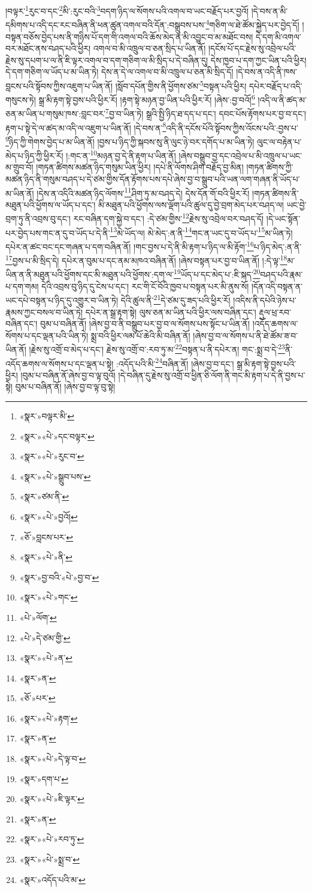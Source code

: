 །བལྟར་\footnote{«སྣར་»བལྟར་མི་}རུང་བ་དང་\footnote{«སྣར་»«པེ་»དང་བལྟར་}མི་:རུང་བའི་\footnote{«སྣར་»«པེ་»རུང་བ་}བདག་ཉིད་ལ་སོགས་པའི་འགལ་བ་ཡང་བརྗོད་པར་བྱའོ། །དེ་བས་ན་མི་དམིགས་པ་འདི་དང་རང་བཞིན་ནི་ཕན་ཚུན་འགལ་བའི་དོན་:བསྒྲུབས་པས་\footnote{«སྣར་»«པེ་»སྒྲུབ་པས་}གཅིག་ལ་ཐེ་ཚོམ་སྐྱེད་པར་བྱེད་དོ། །བསྟན་བཅོས་བྱེད་པས་ནི་གཉིས་པོ་དག་གི་འགལ་བའི་ཆོས་མེད་ན་མི་འབྱུང་བ་མ་མཐོང་བས། དེ་དག་མི་འགལ་བར་མཐོང་ནས་བཤད་པའི་ཕྱིར། འགལ་བ་མི་འཁྲུལ་བ་ཅན་སྲིད་པ་ཡིན་ནོ། །དངོས་པོ་དང་རྗེས་སུ་འབྲེལ་པའི་རྗེས་སུ་དཔག་པ་ལ་ནི་ཇི་ལྟར་འགལ་བ་དག་གཅིག་ལ་མི་སྲིད་པ་དེ་བཞིན་དུ། དེས་ཁྱབ་པ་དག་ཀྱང་ཡིན་པའི་ཕྱིར། དེ་དག་གཅིག་ལ་ཡོད་པ་མ་ཡིན་ཏེ། དེས་ན་དེ་ལ་འགལ་བ་མི་འཁྲུལ་པ་ཅན་མི་སྲིད་དོ། །དེ་བས་ན་འདི་ནི་ཁས་བླངས་པའི་སྟོབས་ཀྱིས་འཇུག་པ་ཡིན་ནོ། །སློབ་དཔོན་གྱིས་ནི་ཕྱོགས་ཙམ་\footnote{«སྣར་»ཙམ་ནི་}བསྟན་པའི་ཕྱིར། དཔེར་བརྗོད་པ་འདི་གསུངས་ཏེ། སྒྲ་མི་རྟག་སྟེ་བྱས་པའི་ཕྱིར་རོ། །རྟག་སྟེ་མཉན་བྱ་ཡིན་པའི་ཕྱིར་རོ། །ཞེས་:བྱ་བའོ།\footnote{«སྣར་»«པེ་»བྱའོ།} །འདི་ལ་ནི་ཚད་མ་ཅན་མ་ཡིན་པ་གསུམ་ཁས་:བླང་བར་\footnote{«ཅོ་»བླངས་པར་}བྱ་བ་ཡིན་ཏེ། སྒྲའི་སྤྱི་ཉིད་ཐ་དད་པ་དང་། དབང་པོས་རྟོགས་པར་བྱ་བ་དང་། རྟག་པ་སྟེ་དེ་ལ་ཚད་མ་འདི་ལ་འཇུག་པ་ཡིན་ནོ། །དེ་བས་ན་\footnote{«སྣར་»«པེ་»ནི་}འདི་ནི་དངོས་པོའི་སྟོབས་ཀྱིས་འོངས་པའི་:བྱས་པ་\footnote{«སྣར་»བྱ་བའི་«པེ་»བྱ་བ་}ཉིད་ཀྱི་གེགས་བྱེད་པ་མ་ཡིན་ནོ། །བྱས་པ་ཉིད་ཀྱི་སྐབས་སུ་ནི་ལུང་ཉེ་བར་དགོད་པ་མ་ཡིན་ཏེ། ལུང་ལ་བརྟེན་པ་མེད་པ་ཉིད་ཀྱི་ཕྱིར་རོ། །:གང་ན་\footnote{«སྣར་»«པེ་»གང་}མཉན་བྱ་དེ་ནི་རྟག་པ་ཡིན་ནོ། །ཞེས་བསྒྲུབ་བྱ་དང་འབྲེལ་པ་མི་འཁྲུལ་པ་ཡང་མ་གྲུབ་བོ། །གཏན་ཚིགས་མཚན་ཉིད་གསུམ་ཡིན་ཕྱིར། །དཔེ་ནི་ལོགས་ཤིག་བརྗོད་བྱ་མིན། །གཏན་ཚིགས་ཀྱི་མཚན་ཉིད་ནི་གསུམ་བཤད་པ་དེ་ཙམ་གྱིས་དོན་རྟོགས་པས་དཔེ་ཞེས་བྱ་བ་སྒྲུབ་པའི་ཡན་ལག་གཞན་ནི་ཡོད་པ་མ་ཡིན་ནོ། །དེས་ན་འདིའི་མཚན་ཉིད་ལོགས་\footnote{«པེ་»ལོག་}ཤིག་ཏུ་མ་བཤད་དེ། དེས་དོན་གོ་བའི་ཕྱིར་རོ། །གཏན་ཚིགས་ནི་མཐུན་པའི་ཕྱོགས་ལ་ཡོད་པ་དང་། མི་མཐུན་པའི་ཕྱོགས་ལས་ལྡོག་པའི་ཚུལ་དུ་བྱེ་བྲག་མེད་པར་བཤད་ལ། ཡང་བྱེ་བྲག་ཏུ་ནི་འབྲས་བུ་དང་། རང་བཞིན་དག་སྐྱེ་བ་དང་། :དེ་ཙམ་གྱིས་\footnote{«པེ་»དེ་ཙམ་གྱི་}རྗེས་སུ་འབྲེལ་བར་བཤད་དོ། །དེ་ཡང་སྟོན་པར་བྱེད་པས་གང་ན་དུ་བ་ཡོད་པ་དེ་ནི་\footnote{«སྣར་»«པེ་»ན་}མེ་ཡོད་ལ། མེ་མེད་:ན་ནི་\footnote{«སྣར་»ན་}གང་ན་ཡང་དུ་བ་ཡོད་པ་\footnote{«ཅོ་»པར་}མ་ཡིན་ཏེ། དཔེར་ན་ཚང་བང་དང་གཞན་པ་དག་བཞིན་ནོ། །གང་བྱས་པ་དེ་ནི་མི་རྟག་པ་ཉིད་ལ་མི་རྟོག་\footnote{«སྣར་»«པེ་»རྟག་}པ་ཉིད་མེད་:ན་ནི་\footnote{«སྣར་»ན་}བྱས་པ་མི་སྲིད་དེ། དཔེར་ན་བུམ་པ་དང་ནམ་མཁའ་བཞིན་ནོ། །ཞེས་བསྟན་པར་བྱ་བ་ཡིན་ནོ། །:དེ་ལྟ་\footnote{«སྣར་»«པེ་»དེ་ལྟ་བ་}མ་ཡིན་ན་ནི་མཐུན་པའི་ཕྱོགས་དང་མི་མཐུན་པའི་ཕྱོགས་:དག་ལ་\footnote{«སྣར་»དག་པ་}ཡོད་པ་དང་མེད་པ་:ཇི་སྐད་\footnote{«སྣར་»«པེ་»ཇི་ལྟར་}བཤད་པའི་རྣམ་པ་དག་གམ། དེའི་འབྲས་བུ་ཉིད་དུ་ངེས་པ་དང་། རང་གི་ངོ་བོའི་ཁྱབ་པ་བསྟན་པར་མི་ནུས་སོ། །དོན་འདི་བསྟན་ན་ཡང་དཔེ་བསྟན་པ་ཉིད་དུ་འགྱུར་བ་ཡིན་ཏེ། དེའི་ཚུལ་ནི་\footnote{«སྣར་»ན་}དེ་ཙམ་དུ་ཟད་པའི་ཕྱིར་རོ། །འདིས་ནི་དཔེའི་ཉེས་པ་རྣམས་ཀྱང་བསལ་བ་ཡིན་ཏེ། དཔེར་ན་སྒྲ་རྟག་སྟེ། ལུས་ཅན་མ་ཡིན་པའི་ཕྱིར་ལས་བཞིན་དང་། རྡུལ་ཕྲ་རབ་བཞིན་དང་། བུམ་པ་བཞིན་ནོ། །ཞེས་བྱ་བ་ནི་བསྒྲུབ་པར་བྱ་བ་ལ་སོགས་པས་སྟོང་པ་ཡིན་ནོ། །འདོད་ཆགས་ལ་སོགས་པ་དང་ལྡན་པའི་ཡིན་ཏེ། སྨྲ་བའི་ཕྱིར་ལམ་པོ་ཆེའི་མི་བཞིན་ནོ། །ཞེས་བྱ་བ་ལ་སོགས་པ་ནི་ཐེ་ཚོམ་ཟ་བ་ཡིན་ནོ། །རྗེས་སུ་འགྲོ་བ་མེད་པ་དང་། རྗེས་སུ་འགྲོ་བ་:རབ་ཏུ་མ་\footnote{«སྣར་»«པེ་»རབ་ཏུ་}བསྟན་པ་ནི་དཔེར་ན། གང་:སྨྲ་བ་དེ་\footnote{«སྣར་»«པེ་»སྨྲ་བ་}ནི་འདོད་ཆགས་ལ་སོགས་པ་དང་ལྡན་པ་སྟེ། :འདོད་པའི་མི་\footnote{«སྣར་»འདོད་པའི་མ་}བཞིན་ནོ། །ཞེས་བྱ་བ་དང་། སྒྲ་མི་རྟག་སྟེ་བྱས་པའི་ཕྱིར། །བུམ་པ་བཞིན་ནོ་ཞེས་བྱ་བ་ལྟ་བུའོ། །དེ་བཞིན་དུ་རྗེས་སུ་འགྲོ་བ་ཕྱིན་ཅི་ལོག་ནི་གང་མི་རྟག་པ་དེ་ནི་བྱས་པ་སྟེ། བུམ་པ་བཞིན་ནོ། །ཞེས་བྱ་བ་ལྟ་བུ་སྟེ། 